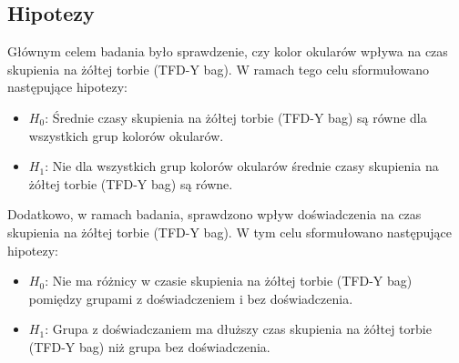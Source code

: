     \subsection{Hipotezy}
    Głównym celem badania było sprawdzenie, czy kolor okularów wpływa na czas skupienia na żółtej torbie (TFD-Y bag).
    W ramach tego celu sformułowano następujące hipotezy:
    \begin{itemize}
        \item $H_0$: Średnie czasy skupienia na żółtej torbie (TFD-Y bag) są równe dla wszystkich grup kolorów okularów.
        \item $H_1$: Nie dla wszystkich grup kolorów okularów średnie czasy skupienia na żółtej torbie (TFD-Y bag) są równe.
    \end{itemize}
    
    Dodatkowo, w ramach badania, sprawdzono wpływ doświadczenia na czas skupienia na żółtej torbie (TFD-Y bag).
    W tym celu sformułowano następujące hipotezy:
    \begin{itemize}
        \item $H_0$: Nie ma różnicy w czasie skupienia na żółtej torbie (TFD-Y bag) pomiędzy grupami z doświadczeniem i bez doświadczenia.
        \item $H_1$: Grupa z doświadczaniem ma dłuższy czas skupienia na żółtej torbie (TFD-Y bag) niż grupa bez doświadczenia.
    \end{itemize}
    
